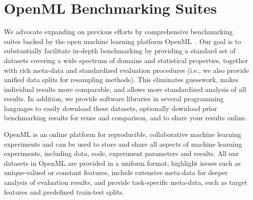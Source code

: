 \documentclass[twoside,11pt]{article}
\begin{document}
\section{OpenML Benchmarking Suites}
We advocate expanding on previous efforts by comprehensive benchmarking suites backed by the open machine learning platform OpenML~\citep{OpenML2013}. Our goal is to substantially facilitate in-depth benchmarking by providing a standard set of datasets covering a wide spectrum of domains and statistical properties, together with rich meta-data and standardized evaluation procedures (i.e., we also provide unified data splits for resampling methods). This eliminates guesswork, makes individual results more comparable, and allows more standardized analysis of all results. In addition, we provide software libraries in several programming languages to easily download these datasets, optionally download prior benchmarking results for reuse and comparison, and to share your results online.  
%



OpenML is an online platform for reproducible, collaborative machine learning experiments and 
can be used to store and share all aspects of machine learning experiments, including data, code, experiment parameters and results.
All our datasets in OpenML are provided in a uniform format, highlight issues such as unique-valued or constant features, include extensive meta-data for deeper analysis of evaluation results, and provide task-specific meta-data, such as target features and predefined train-test splits.
\end{document}
